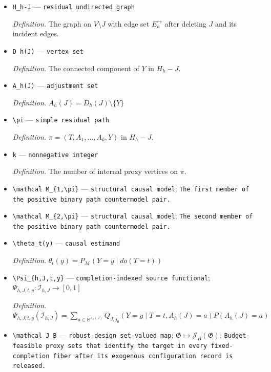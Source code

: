\documentclass{article}
\begin{document}
\begin{itemize}
  \item \texttt{H\_\allowbreak{}h-\allowbreak{}J} --- \texttt{residual undirected graph}
  \par\smallskip\noindent\emph{Definition.} The graph on \(V\setminus J\) with edge set \(E_h^{\leftrightarrow}\) after deleting \(J\) and its incident edges.
  \item \texttt{D\_\allowbreak{}h(J)} --- \texttt{vertex set}
  \par\smallskip\noindent\emph{Definition.} The connected component of \(Y\) in \(H_h-J\).
  \item \texttt{A\_\allowbreak{}h(J)} --- \texttt{adjustment set}
  \par\smallskip\noindent\emph{Definition.} \(A_h(J)=D_h(J)\setminus\{Y\}\)
  \item \texttt{\textbackslash{}\allowbreak{}pi} --- \texttt{simple residual path}
  \par\smallskip\noindent\emph{Definition.} \(\pi=(T,A_1,\ldots,A_k,Y)\) in \(H_h-J\).
  \item \texttt{k} --- \texttt{nonnegative integer}
  \par\smallskip\noindent\emph{Definition.} The number of internal proxy vertices on \(\pi\).
  \item \texttt{\textbackslash{}\allowbreak{}mathcal M\_\allowbreak{}\{1,\allowbreak{}\textbackslash{}\allowbreak{}pi\}\allowbreak{}} --- \texttt{structural causal model}; \texttt{The first member of the positive binary path countermodel pair.}
  \item \texttt{\textbackslash{}\allowbreak{}mathcal M\_\allowbreak{}\{2,\allowbreak{}\textbackslash{}\allowbreak{}pi\}\allowbreak{}} --- \texttt{structural causal model}; \texttt{The second member of the positive binary path countermodel pair.}
  \item \texttt{\textbackslash{}\allowbreak{}theta\_\allowbreak{}t(y)} --- \texttt{causal estimand}
  \par\smallskip\noindent\emph{Definition.} \(\theta_t(y)=P_{\mathcal M}(Y=y\mid do(T=t))\)
  \item \texttt{\textbackslash{}\allowbreak{}Psi\_\allowbreak{}\{h,\allowbreak{}J,\allowbreak{}t,\allowbreak{}y\}\allowbreak{}} --- \texttt{completion-\allowbreak{}indexed source functional}; \(\Psi_{h,J,t,y}:\mathcal I_{h,J}\to[0,1]\)
  \par\smallskip\noindent\emph{Definition.} \(\Psi_{h,J,t,y}(\mathcal I_{h,J})=\sum_{a\in\mathbb B^{A_h(J)}}Q_{J,j_0}(Y=y\mid T=t,A_h(J)=a)P(A_h(J)=a)\)
  \item \texttt{\textbackslash{}\allowbreak{}mathcal J\_\allowbreak{}B} --- \texttt{robust-\allowbreak{}design set-\allowbreak{}valued map}; \(\mathfrak G\mapsto\mathcal J_B(\mathfrak G)\); \texttt{Budget-\allowbreak{}feasible proxy sets that identify the target in every fixed-\allowbreak{}completion fiber after its exogenous configuration record is released.}

\end{itemize}
\end{document}
